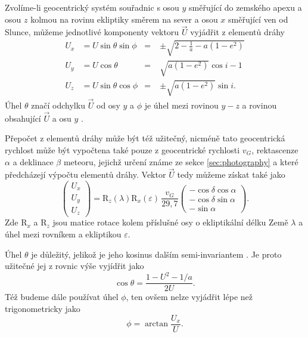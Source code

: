 Zvolíme-li geocentrický systém souřadnic s osou $y$ směřující do zemského apexu a osou $z$ kolmou na rovinu ekliptiky směrem na sever a osou $x$ směřující ven od Slunce, můžeme jednotlivé komponenty vektoru $\vec{U}$ vyjádřit z elementů dráhy \cite{newapproach}
\begin{equation}
    \begin{aligned}
        U_x & = U\sin{\theta}\sin{\phi} & =\; & \pm\sqrt{2-\frac{1}{a}-a(1-e^2)}  \\
        U_y & = U\cos{\theta}           & =\; & \sqrt{a(1-e^2)}\cos{i}-1          \\
        U_z & = U\sin{\theta}\cos{\phi} & =\; & \pm\sqrt{a(1-e^2)}\sin{i}\text{.}
    \end{aligned}
\end{equation}
Úhel $\theta$ značí odchylku $\vec{U}$ od osy $y$ a $\phi$ je úhel mezi rovinou $y-z$ a rovinou obsahující $\vec{U}$ a osu $y$ \cite{newapproach}.

Přepočet z elementů dráhy může být též užitečný, nicméně tato geocentrická rychlost může být vypočtena také pouze z geocentrické rychlosti $v_G$, rektascenze $\alpha$ a deklinace $\beta$ meteoru, jejichž určení známe ze sekce \ref{sec:photography} a které předcházejí výpočtu elementů dráhy. Vektor $\vec{U}$ tedy můžeme získat také jako \cite{newapproach}
\begin{equation}
    \begin{pmatrix}
        U_x\\U_y\\U_z
    \end{pmatrix}=\text{R}_z(\lambda)\text{R}_x(\varepsilon)\,\frac{v_G}{29{,}7}\begin{pmatrix}
        -\cos{\delta}\cos{\alpha}\\
        -\cos{\delta}\sin{\alpha}\\
        -\sin{\alpha}
    \end{pmatrix}\text{.}
\end{equation}
Zde $\text{R}_x$ a $\text{R}_z$ jsou matice rotace kolem příslušné osy o ekliptikální délku Země $\lambda$ a úhel mezi rovníkem a ekliptikou $\varepsilon$.

\medskip

Úhel $\theta$ je důležitý, jelikož je jeho kosinus dalším semi-invariantem \cite{newapproach}. Je proto užitečné jej z rovnic výše vyjídřit jako \cite{newapproach}
\begin{equation}
    \cos{\theta}=\frac{1-U^2-1/a}{2U}\text{.}
\end{equation}
Též budeme dále používat úhel $\phi$, ten ovšem nelze vyjádřit lépe než trigonometricky jako \cite{newapproach}
\begin{equation}
    \phi=\arctan{\frac{U_x}{U}}\text{.}
\end{equation}

